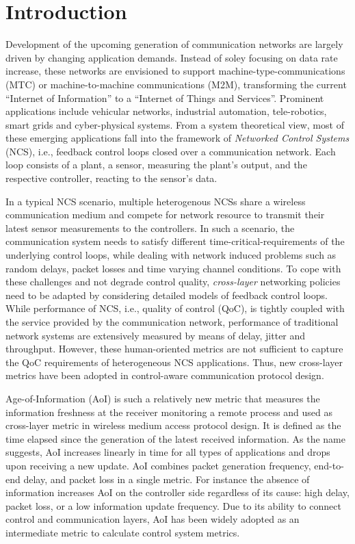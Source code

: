 \chapter{Introduction}

Development of the upcoming generation of communication networks are largely
driven by changing application demands. Instead of soley focusing on data rate
increase, these networks are envisioned to support machine-type-communications
(MTC) or machine-to-machine communications (M2M), transforming the current
``Internet of Information'' to a ``Internet of Things and Services''. Prominent
applications include vehicular networks, industrial automation, tele-robotics,
smart grids and cyber-physical systems. From a system theoretical view, most of
these emerging applications fall into the framework of \textit{Networked Control
Systems} (NCS),  i.e., feedback control loops closed over a communication
network. Each loop consists of a plant, a sensor, measuring the plant's output,
and the respective controller, reacting to the sensor's data. 

In a typical NCS scenario, multiple heterogenous NCSs share a wireless
communication medium and compete for network resource to transmit their latest
sensor measurements to the controllers. In such a scenario, the communication
system needs to satisfy different time-critical-requirements of the underlying
control loops, while dealing with network induced problems such as random
delays, packet losses and time varying channel conditions. To cope with these
challenges and not degrade control quality, \textit{cross-layer} networking
policies need to be adapted by considering detailed models of feedback control
loops. While performance of NCS, i.e., quality of control (QoC), is tightly
coupled with the service provided by the communication network, performance of
traditional network systems are extensively measured by means of delay, jitter
and throughput. However, these human-oriented metrics are not sufficient to
capture the QoC requirements of heterogeneous NCS applications. Thus, new
cross-layer metrics have been adopted in control-aware communication protocol
design.

Age-of-Information (AoI) is such a relatively new metric that measures the
information freshness at the receiver monitoring a remote process
\cite{kaul2012real} and used as cross-layer metric in wireless medium access
protocol design. It is defined as the time elapsed since the generation of
the latest received information. As the name suggests, AoI increases linearly in
time for all types of applications and drops upon receiving a new update. AoI
combines packet generation frequency, end-to-end delay, and packet loss in a
single metric. For instance the absence of information increases AoI on the
controller side regardless of its cause: high delay, packet loss, or a low
information update frequency. Due to its ability to connect control and
communication layers, AoI has been widely adopted as an intermediate metric to
calculate control system metrics. 

